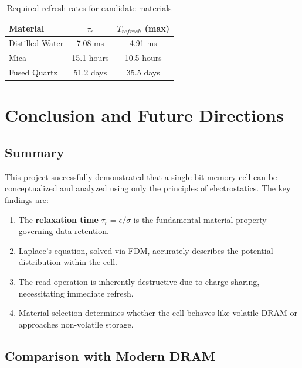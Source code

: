 \documentclass[12pt,a4paper]{report}
\begin{document}
\begin{table}[H]
    \centering
    \caption{Required refresh rates for candidate materials}
    \label{tab:refresh}
    \begin{tabular}{@{}lcc@{}}
        \toprule
        \textbf{Material} & $\tau_r$ & $T_{refresh}$ (max) \\
        \midrule
        Distilled Water & 7.08 ms & 4.91 ms \\
        Mica & 15.1 hours & 10.5 hours \\
        Fused Quartz & 51.2 days & 35.5 days \\
        \bottomrule
    \end{tabular}
\end{table}

\chapter{Conclusion and Future Directions}
\label{ch:conclusion}

\section{Summary}

This project successfully demonstrated that a single-bit memory cell can be conceptualized and analyzed using only the principles of electrostatics. The key findings are:

\begin{enumerate}
    \item The \textbf{relaxation time} $\tau_r = \epsilon/\sigma$ is the fundamental material property governing data retention.
    \item Laplace's equation, solved via FDM, accurately describes the potential distribution within the cell.
    \item The read operation is inherently destructive due to charge sharing, necessitating immediate refresh.
    \item Material selection determines whether the cell behaves like volatile DRAM or approaches non-volatile storage.
\end{enumerate}

\section{Comparison with Modern DRAM}
\end{document}
